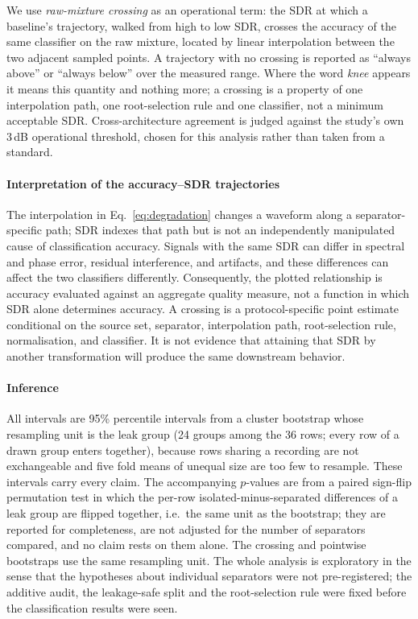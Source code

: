 \documentclass[journal]{IEEEtran}
\begin{document}
We use \emph{raw-mixture crossing} as an operational term: the SDR at which a baseline's trajectory, walked from high to low SDR, crosses the accuracy of the same classifier on the raw mixture, located by linear interpolation between the two adjacent sampled points. A trajectory with no crossing is reported as ``always above'' or ``always below'' over the measured range. Where the word \emph{knee} appears it means this quantity and nothing more; a crossing is a property of one interpolation path, one root-selection rule and one classifier, not a minimum acceptable SDR. Cross-architecture agreement is judged against the study's own 3\,dB operational threshold, chosen for this analysis rather than taken from a standard.

\paragraph{Interpretation of the accuracy--SDR trajectories}
The interpolation in Eq.~\ref{eq:degradation} changes a waveform along a separator-specific path; SDR indexes that path but is not an independently manipulated cause of classification accuracy. Signals with the same SDR can differ in spectral and phase error, residual interference, and artifacts, and these differences can affect the two classifiers differently. Consequently, the plotted relationship is accuracy evaluated against an aggregate quality measure, not a function in which SDR alone determines accuracy. A crossing is a protocol-specific point estimate conditional on the source set, separator, interpolation path, root-selection rule, normalisation, and classifier. It is not evidence that attaining that SDR by another transformation will produce the same downstream behavior.

\paragraph{Inference}
All intervals are 95\% percentile intervals from a cluster bootstrap whose resampling unit is the leak group (24 groups among the 36 rows; every row of a drawn group enters together), because rows sharing a recording are not exchangeable and five fold means of unequal size are too few to resample. These intervals carry every claim. The accompanying $p$-values are from a paired sign-flip permutation test in which the per-row isolated-minus-separated differences of a leak group are flipped together, i.e.\ the same unit as the bootstrap; they are reported for completeness, are not adjusted for the number of separators compared, and no claim rests on them alone. The crossing and pointwise bootstraps use the same resampling unit. The whole analysis is exploratory in the sense that the hypotheses about individual separators were not pre-registered; the additive audit, the leakage-safe split and the root-selection rule were fixed before the classification results were seen.
\end{document}
